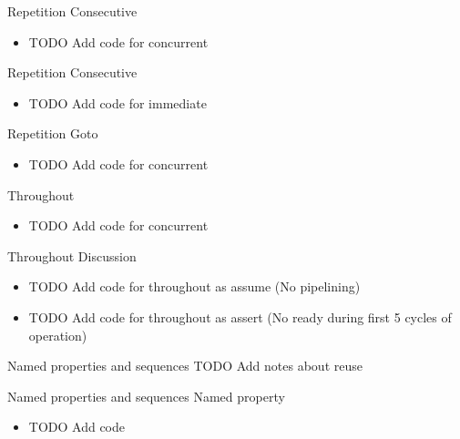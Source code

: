 \documentclass{beamer}
\begin{document}
\begin{frame}{Repetition}
Consecutive

\begin{itemize}
 \item TODO Add code for concurrent
\end{itemize}
\end{frame}


\begin{frame}{Repetition}
Consecutive

\begin{itemize}
 \item TODO Add code for immediate
\end{itemize}
\end{frame}


\begin{frame}{Repetition}
Goto

\begin{itemize}
 \item TODO Add code for concurrent
\end{itemize}
\end{frame}


\begin{frame}{Throughout}
\begin{itemize}
 \item TODO Add code for concurrent
\end{itemize}
\end{frame}


\begin{frame}{Throughout}
Discussion
\begin{itemize}
 \item TODO Add code for throughout as assume (No pipelining)
 \item TODO Add code for throughout as assert (No ready during first 5 cycles of operation)
\end{itemize}
\end{frame}


\begin{frame}{Named properties and sequences}
TODO Add notes about reuse
\end{frame}


\begin{frame}{Named properties and sequences}
Named property
\begin{itemize}
 \item TODO Add code
\end{itemize}
\end{frame}
\end{document}
